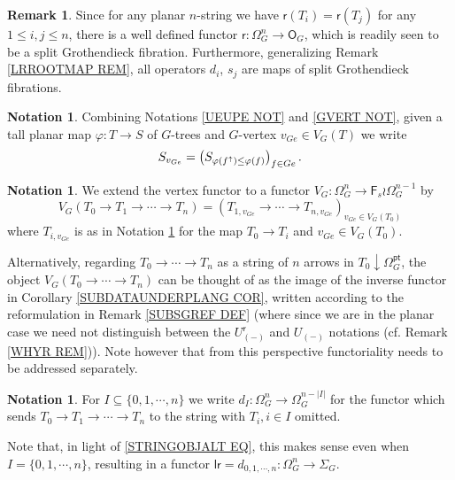 \documentclass[a4paper,10pt
,draft
]{article}%
\numberwithin{equation}{section}
\numberwithin{figure}{section}
\theoremstyle{definition} %
\newtheorem{remark}[equation]{Remark}%
\newtheorem{notation}[equation]{Notation}%
\newcommand{\Fin}{\mathsf{F}}%
\newcommand{\1}{\ensuremath{\mathbbm 1}}%
\begin{document}
\begin{remark}\label{ALLSPLITMAPS REM}
Since for any planar $n$-string we have 
$\mathsf{r}(T_i) = \mathsf{r}(T_j)$
for any $1 \leq i,j \leq n$, 
there is a well defined functor
$\mathsf{r} \colon \Omega_{G}^{n} \to \mathsf{O}_G$,
which is readily seen to be a split Grothendieck fibration.
Furthermore, generalizing Remark \ref{LRROOTMAP REM},
all operators $d_i$, $s_j$ 
are maps of split Grothendieck fibrations.
\end{remark}


\begin{notation}\label{UEUPEG NOT}
	Combining Notations \ref{UEUPE NOT} and \ref{GVERT NOT},
	given a tall planar map
	$\varphi \colon T \to S$ of $G$-trees
	and $G$-vertex $v_{Ge} \in V_G(T)$
	we write
	\[
	S_{v_{Ge}} = 
	\left(S_{\varphi(f^{\uparrow}) \leq \varphi(f)}\right)_{f \in Ge}.\index{SVGE@$S_{v_{Ge}}$}
	\]
\end{notation}


\begin{notation}\label{VGDEF NOT}
We extend the vertex functor to a functor 
$V_G \colon \Omega_{G}^{n} \to \Fin_s \wr \Omega_{G}^{n-1}$
by
\begin{equation}\label{VGDEF EQ}
	V_G(T_0 \to T_1 \to \cdots \to T_n) = 
	(T_{1,v_{Ge}} \to \cdots \to
	T_{n,v_{Ge}})_{v_{Ge} \in V_G(T_0)}	
\end{equation}
where $T_{i,v_{Ge}}$ is as in
Notation \ref{UEUPEG NOT}
for the map $T_0 \to T_i$ and $v_{Ge} \in V_G(T_0)$.

Alternatively, regarding $T_0 \to \cdots \to T_n$ as a string of $n$ arrows in $T_0 \downarrow \Omega_G^{\mathsf{pt}}$, 
the object $V_G(T_0 \to \cdots \to T_n)$
can be thought of as the image of the inverse functor in
Corollary \ref{SUBDATAUNDERPLANG COR},
written according to the reformulation in 
Remark \ref{SUBSGREF DEF}
(where since we are in the planar case we need not distinguish between the
$U_{(\minus)}^{\mathsf{r}}$ and $U_{(\minus)}$ notations
(cf. Remark \ref{WHYR REM})).
Note however that from this perspective
functoriality needs to be addressed separately.
\end{notation}


\begin{notation}\label{DDDDD NOT}
	For $I \subseteq \{0,1,\cdots,n\}$
	we write
	$d_I \colon \Omega^n_G \to \Omega^{n-|I|}_G$
	for the functor which sends 
	$T_0 \to T_1 \to \cdots \to T_n$
	to the string with $T_i, i\in I$ omitted.
	
	Note that, in light of \eqref{STRINGOBJALT EQ},
	this makes sense even when
	$I = \{0,1,\cdots,n\}$,
	resulting in a functor
	$\mathsf{lr} = d_{0,1,\cdots,n}
	\colon \Omega_G^n \to \Sigma_G$.
\end{notation}
\end{document}
